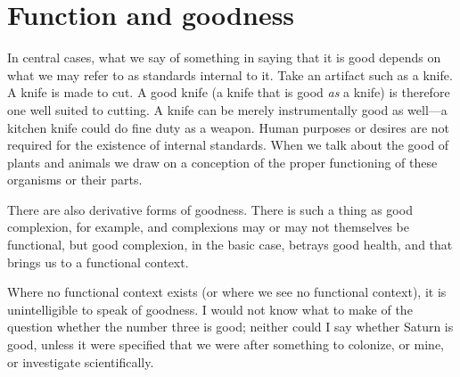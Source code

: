 \documentclass[11pt]{amsart}
\begin{document}




\section{Function and goodness}


In central cases, what we say of something in saying that it is good depends on what we may refer to as standards internal to it. Take an artifact such as a knife. A knife is made to cut. A good knife (a knife that is good \emph{as} a knife) is therefore one well suited to cutting. A knife can be merely instrumentally good as well---a kitchen knife could do fine duty as a weapon. Human purposes or desires are not required for the existence of internal standards. When we talk about the good of plants and animals we draw on a conception of the proper functioning of these organisms or their parts.

There are also derivative forms of goodness. There is such a thing as good complexion, for example, and complexions may or may not themselves be functional, but good complexion, in the basic case, betrays good health, and that brings us to a functional context.

Where no functional context exists (or where we see no functional context), it is unintelligible to speak of goodness. I would not know what to make of the question whether the number three is good; neither could I say whether Saturn is good, unless it were specified that we were after something to colonize, or mine, or investigate scientifically.
\end{document}
